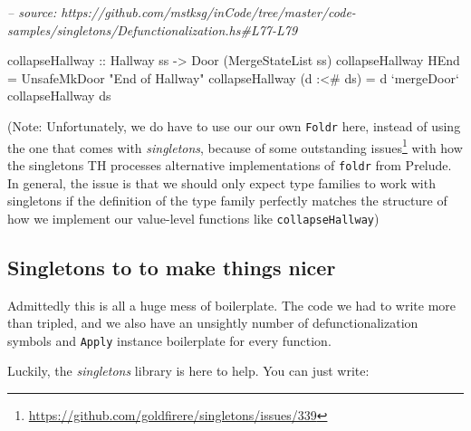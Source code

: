 \documentclass[]{article}
\newenvironment{Shaded}{}{}
\newcommand{\CommentTok}[1]{\textcolor[rgb]{0.38,0.63,0.69}{\textit{#1}}}
\newcommand{\DataTypeTok}[1]{\textcolor[rgb]{0.56,0.13,0.00}{#1}}
\newcommand{\FunctionTok}[1]{\textcolor[rgb]{0.02,0.16,0.49}{#1}}
\newcommand{\NormalTok}[1]{#1}
\newcommand{\OtherTok}[1]{\textcolor[rgb]{0.00,0.44,0.13}{#1}}
\newcommand{\StringTok}[1]{\textcolor[rgb]{0.25,0.44,0.63}{#1}}
\renewcommand{\href}[2]{#2\footnote{\url{#1}}}
\begin{document}
\begin{Shaded}
\begin{Highlighting}[]
\CommentTok{-- source: https://github.com/mstksg/inCode/tree/master/code-samples/singletons/Defunctionalization.hs#L77-L79}

\OtherTok{collapseHallway ::} \DataTypeTok{Hallway}\NormalTok{ ss }\OtherTok{->} \DataTypeTok{Door}\NormalTok{ (}\DataTypeTok{MergeStateList}\NormalTok{ ss)}
\NormalTok{collapseHallway }\DataTypeTok{HEnd}       \FunctionTok{=} \DataTypeTok{UnsafeMkDoor} \StringTok{"End of Hallway"}
\NormalTok{collapseHallway (d }\FunctionTok{:<#}\NormalTok{ ds) }\FunctionTok{=}\NormalTok{ d }\OtherTok{`mergeDoor`}\NormalTok{ collapseHallway ds}
\end{Highlighting}
\end{Shaded}

(Note: Unfortunately, we do have to use our our own \texttt{Foldr} here, instead
of using the one that comes with \emph{singletons}, because of some
\href{https://github.com/goldfirere/singletons/issues/339}{outstanding issues}
with how the singletons TH processes alternative implementations of
\texttt{foldr} from Prelude. In general, the issue is that we should only expect
type families to work with singletons if the definition of the type family
perfectly matches the structure of how we implement our value-level functions
like \texttt{collapseHallway})

\hypertarget{singletons-to-to-make-things-nicer}{%
\subsection{Singletons to to make things
nicer}\label{singletons-to-to-make-things-nicer}}

Admittedly this is all a huge mess of boilerplate. The code we had to write more
than tripled, and we also have an unsightly number of defunctionalization
symbols and \texttt{Apply} instance boilerplate for every function.

Luckily, the \emph{singletons} library is here to help. You can just write:

\begin{Shaded}
\end{Shaded}
\end{document}
